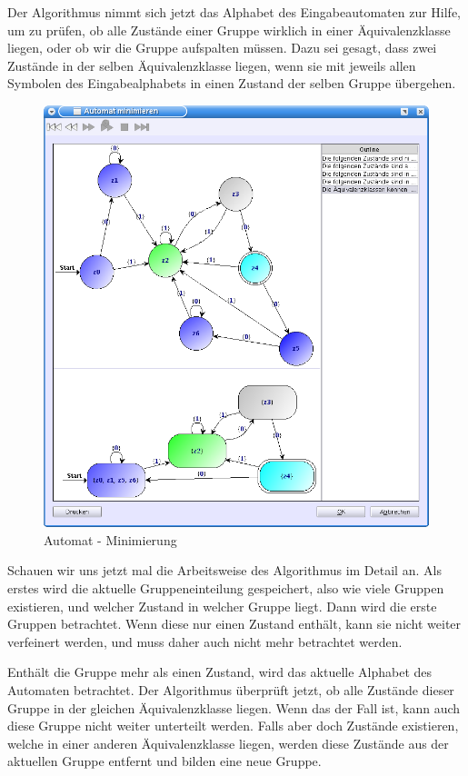 Der Algorithmus nimmt sich jetzt das Alphabet des Eingabeautomaten zur Hilfe, um
zu prüfen, ob alle Zustände einer Gruppe wirklich in einer Äquivalenzklasse
liegen, oder ob wir die Gruppe aufspalten müssen. Dazu sei gesagt, dass zwei
Zustände in der selben Äquivalenzklasse liegen, wenn sie mit jeweils allen
Symbolen des Eingabealphabets in einen Zustand der selben Gruppe
übergehen.\vspace{10pt}

\begin{figure}[h]
\begin{center}
\includegraphics[width=12cm]{../images/minimize.png}
\caption{Automat - Minimierung}
\label{FigureMinimization}
\end{center}
\end{figure}
\vspace{10pt}

Schauen wir uns jetzt mal die Arbeitsweise des Algorithmus im Detail an. Als
erstes wird die aktuelle Gruppeneinteilung gespeichert, also wie viele
Gruppen existieren, und welcher Zustand in welcher Gruppe liegt. Dann wird
die erste Gruppen betrachtet. Wenn diese nur einen Zustand enthält, kann sie
nicht weiter verfeinert werden, und muss daher auch nicht mehr betrachtet werden.
\vspace{10pt}

Enthält die Gruppe mehr als einen Zustand, wird das aktuelle Alphabet des
Automaten betrachtet. Der Algorithmus überprüft jetzt, ob alle Zustände dieser
Gruppe in der gleichen Äquivalenzklasse liegen. Wenn das der Fall ist, kann auch
diese Gruppe nicht weiter unterteilt werden. Falls aber doch Zustände
existieren, welche in einer anderen Äquivalenz\-klasse liegen, werden diese
Zustände aus der aktuellen Gruppe entfernt und bilden eine neue Gruppe. \vspace{10pt}

